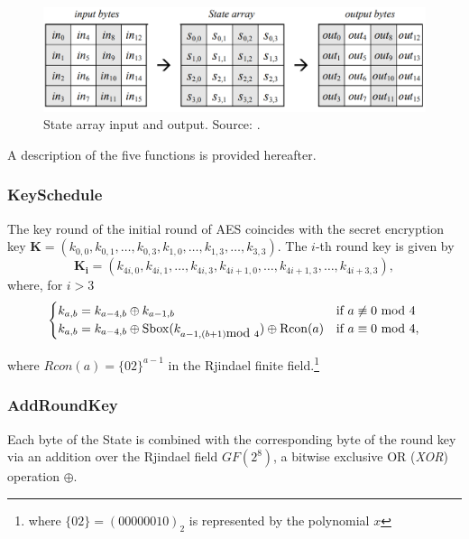 \begin{figure}
\includegraphics[width = \textwidth]{../Figures/FISP_AES/state.png} 
\caption[State array input and output.]{State array input and output. Source: \cite{nist197}.}\label{fig:AES_state}
\end{figure}

A description of the five functions is provided hereafter.

\subsubsection*{KeySchedule}
The key round of the initial round of AES coincides with the secret encryption key $\boldsymbol{K} = (k_{0,0},k_{0,1},\dots,k_{0,3}, k_{1,0},\dots,k_{1,3},\dots,k_{3,3})$. The $i$-th round key is given by 
\begin{equation*}
\boldsymbol{K_i} = (k_{4i,0},k_{4i,1},\dots,k_{4i,3}, k_{4i+1,0},\dots,k_{4i+1,3},\dots,k_{4i+3,3}),
\end{equation*}
where, for $i>3$
\begin{equation*}
\begin{cases}
k_{a,b} = k_{a-4,b}\oplus k_{a-1,b} & \mbox{if } a \not\equiv 0 \mbox{ mod } 4\\
k_{a,b} = k_{a-4,b}\oplus \mathrm{Sbox}(k_{a-1,(b+1) \mbox{mod } 4}) \oplus \mathrm{Rcon}(a) & \mbox{if } a \equiv 0 \mbox{ mod } 4 \mathrm{,}
\end{cases}
\end{equation*}

where $Rcon(a) = \{02\}^{a-1}$ in the Rjindael finite field.\footnote{where $\{02\}=(00000010)_2$ is represented by the polynomial $x$}

\subsubsection*{AddRoundKey} Each byte of the State is combined with the corresponding byte of the round key via an addition over the Rjindael field $GF(2^8)$, \ie a bitwise exclusive OR (\emph{XOR}) operation $\oplus$.
